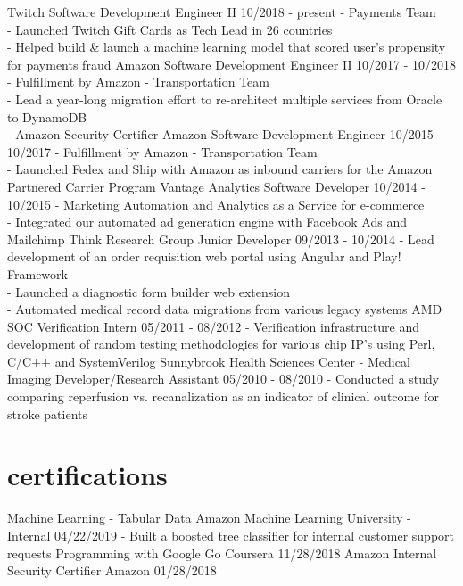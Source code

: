 \documentclass[11pt, print]{friggeri-cv}
\begin{document}
\begin{entrylist}
  \entry
    {Twitch}
    {Software Development Engineer II}
    {10/2018 - present}
    {- Payments Team\\
     - Launched Twitch Gift Cards as Tech Lead in 26 countries\\
     - Helped build \& launch a machine learning model that scored user's propensity for payments fraud}
  \entry
    {Amazon}
    {Software Development Engineer II}
    {10/2017 - 10/2018}
    {- Fulfillment by Amazon - Transportation Team\\
     - Lead a year-long migration effort to re-architect multiple services from Oracle to DynamoDB\\
     - Amazon Security Certifier}
  \entry
    {Amazon}
    {Software Development Engineer}
    {10/2015 - 10/2017}
    {- Fulfillment by Amazon - Transportation Team\\
     - Launched Fedex and Ship with Amazon as inbound carriers for the Amazon Partnered Carrier Program}
  \entry
    {Vantage Analytics}
    {Software Developer}
    {10/2014 - 10/2015}
    {- Marketing Automation and Analytics as a Service for e-commerce\\
     - Integrated our automated ad generation engine with Facebook Ads and Mailchimp}
  \entry
    {Think Research Group}
    {Junior Developer}
    {09/2013 - 10/2014}
    {- Lead development of an order requisition web portal using Angular and Play! Framework\\
     - Launched a diagnostic form builder web extension\\
     - Automated medical record data migrations from various legacy systems}
  \entry
    {AMD}
    {SOC Verification Intern}
    {05/2011 - 08/2012}
    {- Verification infrastructure and development of random testing
    methodologies for various chip IP’s using Perl, C/C++ and SystemVerilog}
  \entry
    {Sunnybrook Health Sciences Center - Medical Imaging}
    {Developer/Research Assistant}
    {05/2010 - 08/2010}
    {- Conducted a study comparing reperfusion vs. recanalization as an indicator of clinical outcome for stroke patients}
\end{entrylist}

\section{certifications}

\begin{entrylist}
  \entry
    {Machine Learning - Tabular Data}
    {Amazon Machine Learning University - Internal}
    {04/22/2019}
    {- Built a boosted tree classifier for internal customer support requests}
  \entry
    {Programming with Google Go}
    {Coursera}
    {11/28/2018}
    {}
  \entry
    {Amazon Internal Security Certifier}
    {Amazon}
    {01/28/2018}
    {}
\end{entrylist}
\end{document}
